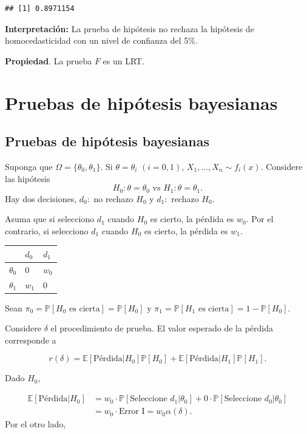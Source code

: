 \documentclass[
  12pt,
]{book}
\begin{document}
\begin{verbatim}
## [1] 0.8971154
\end{verbatim}

\textbf{Interpretación:} La prueba de hipótesis no rechaza la hipótesis de
homocedasticidad con un nivel de confianza del 5\%.

\textbf{Propiedad}. La prueba \(F\) es un LRT.

\hypertarget{pruebas-de-hipuxf3tesis-bayesianas}{%
\chapter{Pruebas de hipótesis bayesianas}\label{pruebas-de-hipuxf3tesis-bayesianas}}

\hypertarget{pruebas-de-hipuxf3tesis-bayesianas-1}{%
\section{Pruebas de hipótesis bayesianas}\label{pruebas-de-hipuxf3tesis-bayesianas-1}}

Suponga que \(\Omega = \{\theta_0,\theta_1\}\). Si \(\theta = \theta_i\) \((i = 0,1)\), \(X_1,\dots, X_n\sim f_i(x)\). Considere las hipótesis
\[H_0: \theta = \theta_0 \text{ vs } H_1: \theta =\theta_1.\]
Hay dos decisiones, \(d_0:\) no rechazo \(H_0\) y \(d_1:\) rechazo \(H_0\).

Asuma que si selecciono \(d_1\) cuando \(H_0\) es cierto, la pérdida es \(w_0\). Por el contrario, si selecciono \(d_1\) cuando \(H_0\) es cierto, la pérdida es \(w_1\).

\begin{longtable}[]{@{}lll@{}}
\toprule
& \(d_0\) & \(d_1\)\tabularnewline
\midrule
\endhead
\(\theta_0\) & 0 & \(w_0\)\tabularnewline
\(\theta_1\) & \(w_1\) & 0\tabularnewline
\bottomrule
\end{longtable}

Sean \(\pi_0 = \mathbb P[H_0 \text{ es cierta}] = \mathbb P[H_0]\) y \(\pi_1 = \mathbb P[H_1 \text{ es cierta}] = 1 -\mathbb P[H_0]\).

Considere \(\delta\) el procedimiento de prueba. El valor esperado de la pérdida corresponde a

\[ r(\delta)  = \mathbb E[\text{Pérdida}|H_0] \mathbb P[H_0] + \mathbb E[\text{Pérdida}|H_1]\mathbb P[H_1].\]

Dado \(H_0\),

\begin{align*}
\mathbb E[\text{Pérdida}|H_0] & = w_0\cdot \mathbb P[\text{Seleccione } d_1|\theta_0] + 0\cdot \mathbb P[\text{Seleccione } d_0|\theta_0]\\
& = w_0 \cdot \text{Error I} = w_0\alpha(\delta).
\end{align*}
Por el otro lado,
\end{document}
